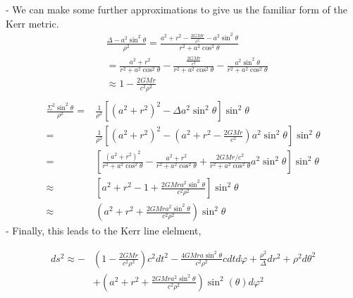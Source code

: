 - We can make some further approximations to give us the familiar form of the Kerr metric.
\begin{align}
     & \frac{\Delta-a^2 \sin ^2 \theta}{\rho^2}=\frac{a^2+r^2-\frac{2 G M r}{c^2}-a^2 \sin ^2 \theta}{r^2+a^2 \cos ^2 \theta}                       \\
     & =\frac{a^2+r^2}{r^2+a^2 \cos ^2 \theta}-\frac{\frac{2 G M r}{c^2}}{r^2+a^2 \cos ^2 \theta}-\frac{a^2 \sin ^2 \theta}{r^2+a^2 \cos ^2 \theta} \\
     & \approx 1-\frac{2 G M r}{c^2 \rho^2}                                                                                                         \\
\end{align}
\begin{align}
    \frac{\Sigma^2 \sin ^2 \theta}{\rho^2}= & \frac{1}{\rho^2}\left[\left(a^2+r^2\right)^2-\Delta a^2 \sin ^2 \theta\right] \sin ^2 \theta                                                                                                \\
    =                                       & \frac{1}{\rho^2}\left[\left(a^2+r^2\right)^2-\left(a^2+r^2-\frac{2 G M r}{c^2}\right) a^2 \sin ^2 \theta\right] \sin ^2 \theta                                                              \\
    =                                       & {\left[\frac{\left(a^2+r^2\right)^2}{r^2+a^2 \cos ^2 \theta}-\frac{a^2+r^2}{r^2+a^2 \cos ^2 \theta}+\frac{2 G M r / c^2}{r^2+a^2 \cos ^2 \theta} a^2 \sin ^2 \theta\right] \sin ^2 \theta } \\
    \approx                                 & {\left[a^2+r^2-1+\frac{2 G M r a^2 \sin ^2 \theta}{c^2 \rho^2}\right] \sin ^2 \theta }                                                                                                      \\
    \approx                                 & \left(a^2+r^2+\frac{2 G M r a^2 \sin ^2 \theta}{c^2 \rho^2}\right) \sin ^2 \theta
\end{align}
- Finally, this leads to the Kerr line elelment,


\begin{align}
    d s^2 \approx- & \left(1-\frac{2 G M r}{c^2 \rho^2}\right) c^2 d t^2-\frac{4 G M r a \sin ^2 \theta}{c^2 \rho^2} c d t d \varphi+\frac{\rho^2}{\Delta} d r^2+\rho^2 d \theta^2 \\
                   & +\left(a^2+r^2+\frac{2 G M r a^2 \sin ^2 \theta}{c^2 \rho^2}\right)\sin^2(\theta) d \varphi^2
\end{align}


